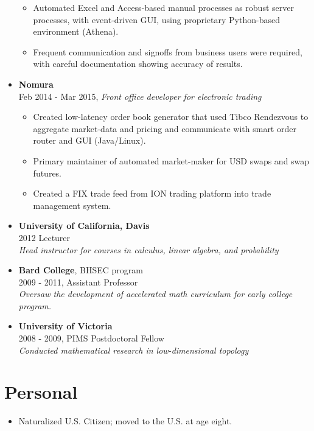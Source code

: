 \documentclass[margin]{res}
\def\tightlist{}
\begin{document}
\begin{resume}
\begin{itemize}
  \begin{itemize}
  \tightlist
  \item
    Automated Excel and Access-based manual processes as robust server
    processes, with event-driven GUI, using proprietary Python-based
    environment (Athena).
  \item
    Frequent communication and signoffs from business users were
    required, with careful documentation showing accuracy of results.
  \end{itemize}
\item
  \textbf{Nomura}\\
  Feb 2014 - Mar 2015, \emph{Front office developer for electronic
  trading}

  \begin{itemize}
  \tightlist
  \item
    Created low-latency order book generator that used Tibco Rendezvous
    to aggregate market-data and pricing and communicate with smart
    order router and GUI (Java/Linux).
  \item
    Primary maintainer of automated market-maker for USD swaps and swap
    futures.
  \item
    Created a FIX trade feed from ION trading platform into trade
    management system.
  \end{itemize}
\item
  \textbf{University of California, Davis}\\
  2012 Lecturer\\
  \emph{Head instructor for courses in calculus, linear algebra, and
  probability}
\item
  \textbf{Bard College}, BHSEC program\\
  2009 - 2011, Assistant Professor\\
  \emph{Oversaw the development of accelerated math curriculum for early
  college program.}
\item
  \textbf{University of Victoria}\\
  2008 - 2009, PIMS Postdoctoral Fellow\\
  \emph{Conducted mathematical research in low-dimensional topology}
\end{itemize}

\section{Personal}\label{personal}

\begin{itemize}
\tightlist
\item
  Naturalized U.S. Citizen; moved to the U.S. at age eight.
\end{itemize}

\end{resume}
\end{document}
